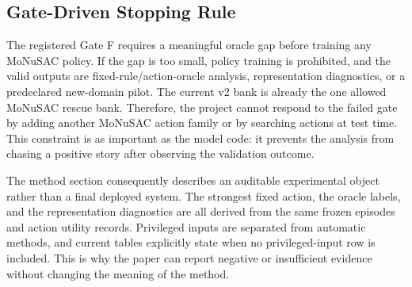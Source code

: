 \subsection{Gate-Driven Stopping Rule}
The registered Gate F requires a meaningful oracle gap before training any MoNuSAC policy. If the gap is too small, policy training is prohibited, and the valid outputs are fixed-rule/action-oracle analysis, representation diagnostics, or a predeclared new-domain pilot. The current v2 bank is already the one allowed MoNuSAC rescue bank. Therefore, the project cannot respond to the failed gate by adding another MoNuSAC action family or by searching actions at test time. This constraint is as important as the model code: it prevents the analysis from chasing a positive story after observing the validation outcome.

The method section consequently describes an auditable experimental object rather than a final deployed system. The strongest fixed action, the oracle labels, and the representation diagnostics are all derived from the same frozen episodes and action utility records. Privileged inputs are separated from automatic methods, and current tables explicitly state when no privileged-input row is included. This is why the paper can report negative or insufficient evidence without changing the meaning of the method.
